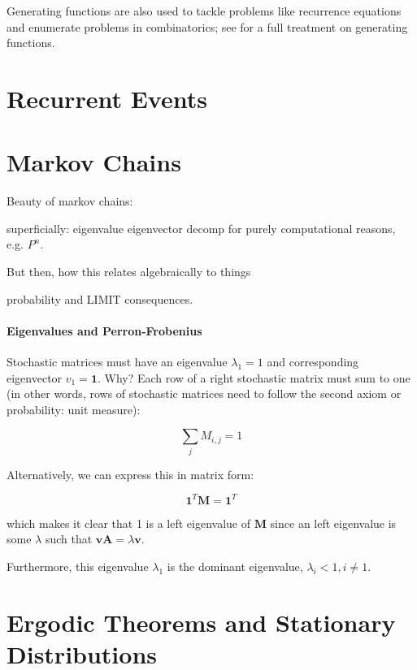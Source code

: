 \documentclass[11pt]{article}
\begin{document}
Generating functions are also used to tackle problems like recurrence equations
and enumerate problems in combinatorics; see
\citep{wilf2013generatingfunctionology} for a full treatment on generating
functions.

\section{Recurrent Events}






\section{Markov Chains}

Beauty of markov chains: 

superficially: eigenvalue eigenvector decomp for purely computational reasons, e.g. $P^n$. 

But then, how this relates algebraically to things

probability and LIMIT consequences.

\paragraph{Eigenvalues and Perron-Frobenius}

Stochastic matrices must have an eigenvalue $\lambda_1 = 1$ and corresponding
eigenvector $v_1 = \mathbf{1}$. Why? Each row of a right stochastic matrix must
sum to one (in other words, rows of stochastic matrices need to follow the
second axiom or probability: unit measure):

$$
\sum_{j} M_{i,j} = 1
$$

Alternatively, we can express this in matrix form:

$$
\mathbf{1}^T \mathbf{M} = \mathbf{1}^T
$$

which makes it clear that 1 is a left eigenvalue of $\mathbf{M}$ since an left
eigenvalue is some $\lambda$ such that $\mathbf{v} \mathbf{A} = \lambda
\mathbf{v}$. 

Furthermore, this eigenvalue $\lambda_1$ is the dominant
eigenvalue, $\lambda_i < 1, i \ne 1$.


\section{Ergodic Theorems and Stationary Distributions}
\end{document}
